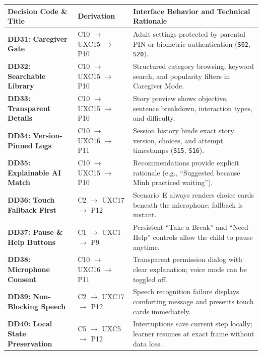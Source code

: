 \begin{xltabular}{\textwidth}{|p{3.5cm}|p{2.5cm}|X|}
\hline
\textbf{Decision Code \& Title} & \textbf{Derivation} & \textbf{Interface Behavior and Technical Rationale} \\ \hline
\endhead
\textbf{DD31: Caregiver Gate} & C10 $\rightarrow$ UXC15 $\rightarrow$ P10 & Adult settings protected by parental PIN or biometric authentication (\texttt{S02}, \texttt{S20}). \\ \hline
\textbf{DD32: Searchable Library} & C10 $\rightarrow$ UXC15 $\rightarrow$ P10 & Structured category browsing, keyword search, and popularity filters in Caregiver Mode. \\ \hline
\textbf{DD33: Transparent Details} & C10 $\rightarrow$ UXC15 $\rightarrow$ P10 & Story preview shows objective, sentence breakdown, interaction types, and difficulty. \\ \hline
\textbf{DD34: Version-Pinned Logs} & C10 $\rightarrow$ UXC16 $\rightarrow$ P11 & Session history binds exact story version, choices, and attempt timestamps (\texttt{S15}, \texttt{S16}). \\ \hline
\textbf{DD35: Explainable AI Match} & C10 $\rightarrow$ UXC15 $\rightarrow$ P10 & Recommendations provide explicit rationale (e.g., ``Suggested because Minh practiced waiting''). \\ \hline
\textbf{DD36: Touch Fallback First} & C2 $\rightarrow$ UXC17 $\rightarrow$ P12 & Scenario~E always renders choice cards beneath the microphone; fallback is instant. \\ \hline
\textbf{DD37: Pause \& Help Buttons} & C1 $\rightarrow$ UXC1 $\rightarrow$ P9 & Persistent ``Take a Break'' and ``Need Help'' controls allow the child to pause anytime. \\ \hline
\textbf{DD38: Microphone Consent} & C10 $\rightarrow$ UXC16 $\rightarrow$ P11 & Transparent permission dialog with clear explanation; voice mode can be toggled off. \\ \hline
\textbf{DD39: Non-Blocking Speech} & C2 $\rightarrow$ UXC17 $\rightarrow$ P12 & Speech recognition failure displays comforting message and presents touch cards immediately. \\ \hline
\textbf{DD40: Local State Preservation} & C5 $\rightarrow$ UXC5 $\rightarrow$ P12 & Interruptions save current step locally; learner resumes at exact frame without data loss. \\ \hline
\end{xltabular}
\label{tab:c5_dd_data}

